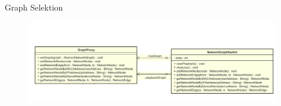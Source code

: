 \begin{frame}{Graph Selektion}
  \begin{figure}
    \centering
    \includegraphics[width=\textwidth]{./images/graph-proxy.png}
  \end{figure}
\end{frame}
